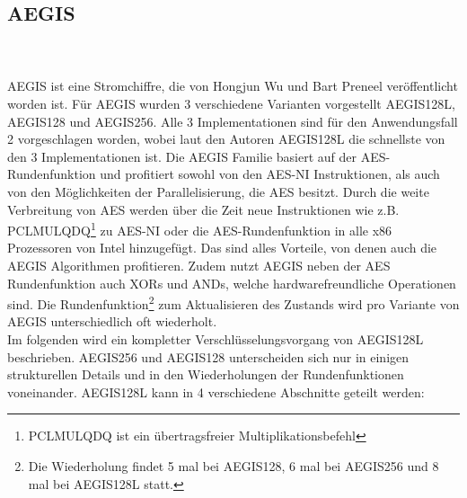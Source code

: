\subsection{AEGIS}
\label{sec:aegis}
\\
\\
AEGIS ist eine Stromchiffre, die von Hongjun Wu und
Bart Preneel veröffentlicht worden ist.
Für AEGIS wurden 3 verschiedene Varianten vorgestellt AEGIS128L, AEGIS128 und AEGIS256. Alle 3 Implementationen sind für den Anwendungsfall 2 vorgeschlagen worden, wobei laut den Autoren AEGIS128L die schnellste von den 3 Implementationen ist. Die AEGIS Familie basiert auf der AES-Rundenfunktion und profitiert sowohl von den \gls{AES-NI} Instruktionen, als auch von den Möglichkeiten der Parallelisierung, die AES besitzt. Durch die weite Verbreitung von \gls{AES} werden über die Zeit neue Instruktionen wie z.B. PCLMULQDQ\footnote[8]{PCLMULQDQ ist ein übertragsfreier Multiplikationsbefehl} zu \gls{AES-NI} oder die AES-Rundenfunktion in alle x86 Prozessoren von Intel hinzugefügt. Das sind alles Vorteile, von denen auch die AEGIS Algorithmen profitieren. Zudem nutzt AEGIS neben der AES Rundenfunktion auch XORs und ANDs, welche hardwarefreundliche Operationen sind. Die Rundenfunktion\footnote[9]{Die Wiederholung findet 5 mal bei AEGIS128, 6 mal bei AEGIS256 und 8 mal bei AEGIS128L statt. } zum Aktualisieren des Zustands wird pro Variante von AEGIS unterschiedlich oft wiederholt.
\\
Im folgenden wird ein kompletter Verschlüsselungsvorgang von AEGIS128L beschrieben. AEGIS256 und AEGIS128 unterscheiden sich nur in einigen strukturellen Details und in den Wiederholungen der Rundenfunktionen voneinander.
AEGIS128L kann in 4 verschiedene Abschnitte geteilt werden:
